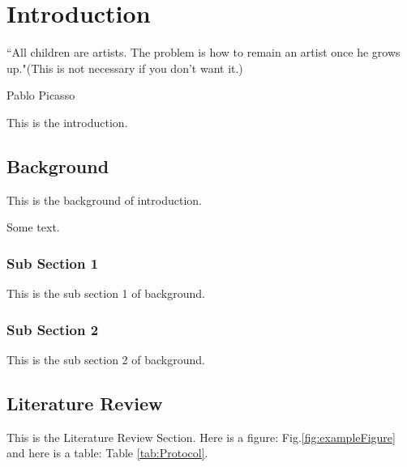 \chapter{Introduction}
\label{intro} %

\epigraph{``All children are artists. The problem is how to remain an artist once he grows up."(This is not necessary if you don't want it.)}
{Pablo Picasso}

This is the introduction.

\section{Background}
\label{sec:S1}

This is the background of introduction.

Some text.

\subsection{Sub Section 1}
\label{sec:SS1}

This is the sub section 1 of background.

\subsection{Sub Section 2}
\label{sec:SS2}

This is the sub section 2 of background.



\section{Literature Review}
\label{sec:InterventionRobotics}

This is the Literature Review Section. Here is a figure: Fig.\ref{fig:exampleFigure} and here is a table: Table \ref{tab:Protocol}.

